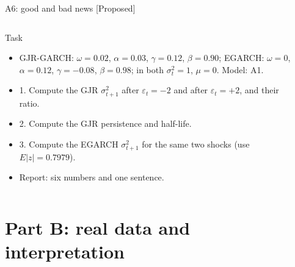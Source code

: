 \begin{frame}{A6: good and bad news [Proposed]}
\propsub
\itemsize{\scriptsize}
\begin{columns}[T]
\begin{column}{\taskw}
\begin{block}{Task}
\begin{itemize}
    \item GJR-GARCH: $\omega = 0.02$, $\alpha = 0.03$, $\gamma = 0.12$, $\beta = 0.90$; EGARCH: $\omega = 0$, $\alpha = 0.12$, $\gamma = -0.08$, $\beta = 0.98$; in both $\sigma_t^2 = 1$, $\mu = 0$. Model: A1.
    \item 1. Compute the GJR $\sigma_{t+1}^2$ after $\varepsilon_t = -2$ and after $\varepsilon_t = +2$, and their ratio.
    \item 2. Compute the GJR persistence and half-life.
    \item 3. Compute the EGARCH $\sigma_{t+1}^2$ for the same two shocks (use $E|z| = 0.7979$).
    \item Report: six numbers and one sentence.
\end{itemize}
\end{block}
\end{column}
\begin{column}{\solw}
\end{column}
\end{columns}
\end{frame}


\section{Part B: real data and interpretation}

